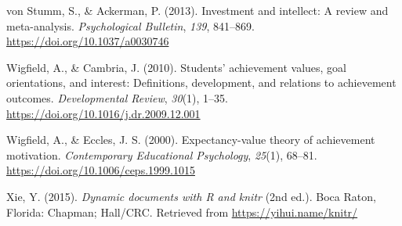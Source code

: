 \documentclass[
  man]{apa6}
\newlength{\cslhangindent}
\newlength{\cslentryspacingunit} %
\newenvironment{CSLReferences}[2] %
 {%
  \setlength{\parindent}{0pt}
  \ifodd #1
  \let\oldpar\par
  \def\par{\hangindent=\cslhangindent\oldpar}
  \fi
  \setlength{\parskip}{#2\cslentryspacingunit}
 }%
 {}
\begin{document}
\begin{CSLReferences}{1}{0}
\leavevmode{}%
von Stumm, S., \& Ackerman, P. (2013). Investment and intellect: A review and meta-analysis. \emph{Psychological Bulletin}, \emph{139}, 841--869. \url{https://doi.org/10.1037/a0030746}

\leavevmode{}%
Wigfield, A., \& Cambria, J. (2010). Students' achievement values, goal orientations, and interest: Definitions, development, and relations to achievement outcomes. \emph{Developmental Review}, \emph{30}(1), 1--35. \url{https://doi.org/10.1016/j.dr.2009.12.001}

\leavevmode{}%
Wigfield, A., \& Eccles, J. S. (2000). Expectancy-value theory of achievement motivation. \emph{Contemporary Educational Psychology}, \emph{25}(1), 68--81. \url{https://doi.org/10.1006/ceps.1999.1015}

\leavevmode{}%
Xie, Y. (2015). \emph{Dynamic documents with {R} and knitr} (2nd ed.). Boca Raton, Florida: Chapman; Hall/CRC. Retrieved from \url{https://yihui.name/knitr/}

\end{CSLReferences}

\endgroup

\newpage
\end{document}
